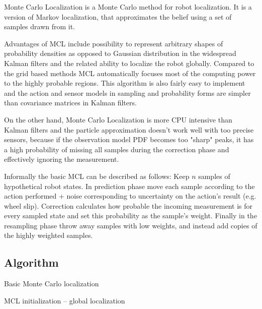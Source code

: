
Monte Carlo Localization \cite{dellaert99} is a Monte Carlo method for
robot localization.
It is a version of Markov localization, that approximates the belief
using a set of samples drawn from it.

Advantages of MCL include 
possibility to represent arbitrary shapes of probability densities as opposed to
Gaussian distribution in the widespread Kalman filters
and the related ability to localize the robot globally.
Compared to the grid based methods MCL automatically focuses most of the
computing power to the highly probable regions.
This algorithm is also fairly easy to implement and the action and sensor models
in sampling and probability forms are simpler than covariance matrices in
Kalman filters.

On the other hand, Monte Carlo Localization is more CPU intensive than Kalman filters
and the particle approximation doesn't work well with too precise sensors,
because if the observation model PDF becomes too "sharp" peaks, it has a high probability
of missing all samples during the correction phase and effectively ignoring the measurement.

Informally the basic MCL can be described as follows:
Keep \(n\) samples of hypothetical robot states.
In prediction phase move each sample according to the action performed + noise corresponding
to uncertainty on the action's result (e.g. wheel slip).
Correction calculates how probable the incoming measurement is
for every sampled state and set this probability as the sample's weight.
Finally in the resampling phase throw away samples with low weights, and
instead add copies of the highly weighted samples.

\subsection{Algorithm}

\begin{algorithm}[tp]
	\samples \assign \initialize{}\;
	\Forever{}{
		\samples \assign \predict{\samples, \getAction{}}\;
		\weights \assign \correct{\samples, \getObservation{}}\;
		\samples \assign \resample{\samples, \weights}\;
		\BlankLine
		\outputPosition{\samples}
	}
	\caption{Basic Monte Carlo localization}
	\label{algo:mcl}
\end{algorithm}


\begin{algorithm}[tp]
	\caption{MCL initialization -- global localization}
	\label{algo:mcl-init}
\end{algorithm}


